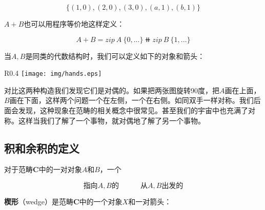 \documentclass{article}
\begin{document}
\[
\{(1, 0), (2, 0), (3, 0), (a, 1), (b, 1)\}
\]

$A + B$也可以用程序等价地这样定义：

\begin{mdframed}
\[
A + B = zip\ A\ \{0, ...\} \doubleplus zip\ B\ \{1, ...\}
\]
\end{mdframed}


当$A, B$是同类的代数结构时，我们可以定义如下的对象和箭头：

\begin{center}
\end{center}

\begin{wrapfigure}{R}{0.4\textwidth}
 \centering
 \texttt{[image: img/hands.eps]}
 \captionsetup{labelformat=empty}
 \caption{}
 \label{fig:hands}
\end{wrapfigure}

对比这两种构造我们发现它们是对偶的。如果把两张图旋转90度，把$A$画在上面，$B$画在下面，这样两个问题一个在左侧，一个在右侧。如同双手一样对称。我们后面会发现，这种现象在范畴的相关概念中很常见。甚至我们的宇宙中也充满了对称。这样当我们了解了一个事物，就对偶地了解了另一个事物。

\subsection{积和余积的定义}
 
\begin{definition}
对于范畴$\pmb{C}$中的一对对象$A$和$B$，一个

\[
\text{指向$A, B$的} \quad \quad \quad \text{从$A, B$出发的}
\]

\textbf{楔形}（wedge）是范畴$\pmb{C}$中的一个对象$X$和一对箭头：

\begin{center}
\end{center}
\end{definition}
\end{document}
